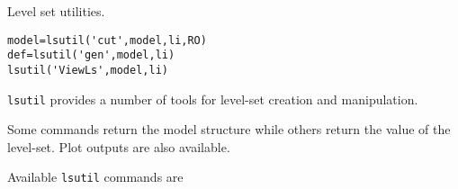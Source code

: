 

Level set utilities.


\rsyntax
\begin{verbatim}
model=lsutil('cut',model,li,RO)
def=lsutil('gen',model,li)
lsutil('ViewLs',model,li) 
\end{verbatim}



{\tt lsutil} provides a number of tools for level-set creation and manipulation. 

Some commands return the model structure while others return the value of the level-set. Plot outputs are also available.

\noindent Available {\tt lsutil} commands are





